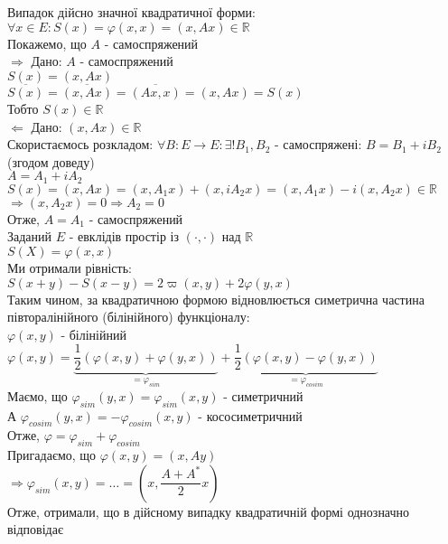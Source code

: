\documentclass[a4paper, 10pt]{article}
\theoremstyle{theoremdd}
\begin{document}
Випадок дійсно значної квадратичної форми:\\
$\forall x \in E: S(x) = \varphi(x,x) = (x,Ax) \in \mathbb{R}$\\
Покажемо, що $A$ - самоспряжений\\
$\boxed{\Rightarrow}$ Дано: $A$ - самоспряжений\\
$S(x) = (x,Ax)$\\
$\overline{S(x)} = \overline{(x,Ax)} = \overline{(Ax,x)} = (x,Ax) = S(x)$\\
Тобто $S(x) \in \mathbb{R}$
\bigskip \\
$\boxed{\Leftarrow}$ Дано: $(x,Ax) \in \mathbb{R}$\\
Скористаємось розкладом: $\forall B: E \to E: \exists ! B_1,B_2$ - самоспряжені: $B = B_1 + i B_2$ (згодом доведу)\\
$A = A_1 + i A_2$\\
$S(x) = (x,Ax)= (x,A_1x) + (x,iA_2x) = (x,A_1x) - i(x,A_2x) \in \mathbb{R}$\\
$\Rightarrow (x,A_2x) = 0 \Rightarrow A_2 = 0$\\
Отже, $A = A_1$ - самоспряжений
\bigskip \\
Заданий $E$ - евклідів простір із $(\cdot, \cdot)$ над $\mathbb{R}$\\
$S(X) = \varphi(x,x)$\\
Ми отримали рівність:\\
$S(x+y)-S(x-y) = 2\varpi(x,y) + 2\varphi(y,x)$\\
Таким чином, за квадратичною формою відновлюється симетрична частина півторалінійного (білінійного) функціоналу:\\
$\varphi(x,y)$ - білінійний\\
$\varphi(x,y) =  \underbrace{\dfrac{1}{2} \left(\varphi(x,y) + \varphi(y,x) \right)}_{= \varphi_{sim}} + \underbrace{\dfrac{1}{2} \left(\varphi(x,y) - \varphi(y,x) \right)}_{= \varphi_{cosim}}$\\
Маємо, що $\varphi_{sim}(y,x) = \varphi_{sim}(x,y)$ - симетричний\\
А $\varphi_{cosim}(y,x) = -\varphi_{cosim}(x,y)$ - кососиметричний\\
Отже, $\varphi = \varphi_{sim} + \varphi_{cosim}$\\
Пригадаємо, що $\varphi(x,y) = (x,Ay)$\\
$\Rightarrow \varphi_{sim}(x,y) = \dots = \left(x, \dfrac{A+A^*}{2}x \right)$\\
Отже, отримали, що в дійсному випадку квадратичній формі однозначно відповідає\\
\end{document}
